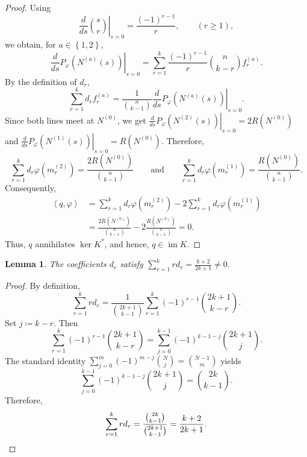 \documentclass[11pt]{amsart}
\theoremstyle{plain}
\newtheorem{lemma}{Lemma}
\theoremstyle{definition}
\theoremstyle{remark}
\numberwithin{equation}{section}
\newcommand{\1}{\mathbf 1}
\begin{document}
\begin{proof}
Using
\[
\left.\frac{d}{ds}\binom{s}{r}\right\rvert_{s=0}=\frac{\left(-1\right)^{r-1}}{r},\qquad (r\ge1),
\]
we obtain, for \(a\in\left\{1,2\right\}\),
\[
\left.\frac{d}{ds}P_\varphi\left(N^{\left(a\right)}\left(s\right)\right)\right\rvert_{s=0}=\sum_{r=1}^k\frac{\left(-1\right)^{r-1}}{r}\binom{n}{k-r}f_r^{\left(a\right)}.
\]
By the definition of \(d_r\),
\[
\sum_{r=1}^kd_rf_r^{\left(a\right)}=\frac{1}{\binom{n}{k-1}}\left.\frac{d}{ds}P_\varphi\left(N^{\left(a\right)}\left(s\right)\right)\right\rvert_{s=0}.
\]
Since both lines meet at \(N^{\left(0\right)}\), we get \(\left.\frac{d}{ds}P_\varphi\left(N^{\left(2\right)}\left(s\right)\right)\right\rvert_{s=0}=2R\left(N^{\left(0\right)}\right)\) and \(\left.\frac{d}{ds}P_\varphi\left(N^{\left(1\right)}\left(s\right)\right)\right\rvert_{s=0}=R\left(N^{\left(0\right)}\right)\). Therefore,
\[
\sum_{r=1}^kd_r\varphi\left(m_r^{\left(2\right)}\right)=\frac{2R\left(N^{\left(0\right)}\right)}{\binom{n}{k-1}}
\qquad \text{and} \qquad
\sum_{r=1}^kd_r\varphi\left(m_r^{\left(1\right)}\right)=\frac{R\left(N^{\left(0\right)}\right)}{\binom{n}{k-1}}.
\]
Consequently,
\[
\begin{aligned}
\left\langle q,\varphi\right\rangle&=\sum_{r=1}^kd_r\varphi\left(m_r^{\left(2\right)}\right)-2\sum_{r=1}^kd_r\varphi\left(m_r^{\left(1\right)}\right)\\
&=\frac{2R\left(N^{\left(0\right)}\right)}{\binom{n}{k-1}}-2\frac{R\left(N^{\left(0\right)}\right)}{\binom{n}{k-1}}=0.
\end{aligned}
\]
Thus, \(q\) annihilates \(\ker K^*\), and hence, \(q\in\operatorname{im}K\).
\end{proof}

\begin{lemma}\label{lem:anomaly}The coefficients \(d_r\) satisfy \(\sum_{r=1}^krd_r=\frac{k+2}{2k+1}\ne0\).
\end{lemma}

\begin{proof}
By definition,
\[
\sum_{r=1}^krd_r=\frac{1}{\binom{2k+1}{k-1}}\sum_{r=1}^k\left(-1\right)^{r-1}\binom{2k+1}{k-r}.
\]
Set \(j\coloneqq k-r\). Then
\[
\sum_{r=1}^k\left(-1\right)^{r-1}\binom{2k+1}{k-r}=\sum_{j=0}^{k-1}\left(-1\right)^{k-1-j}\binom{2k+1}{j}.
\]
The standard identity \(\sum_{j=0}^{m}\left(-1\right)^{m-j}\binom{N}{j}=\binom{N-1}{m}\) yields
\[
\sum_{j=0}^{k-1}\left(-1\right)^{k-1-j}\binom{2k+1}{j}=\binom{2k}{k-1}.
\]
Therefore,
\[
\sum_{r=1}^krd_r=\frac{\binom{2k}{k-1}}{\binom{2k+1}{k-1}}=\frac{k+2}{2k+1}. \qedhere
\]
\end{proof}
\end{document}
